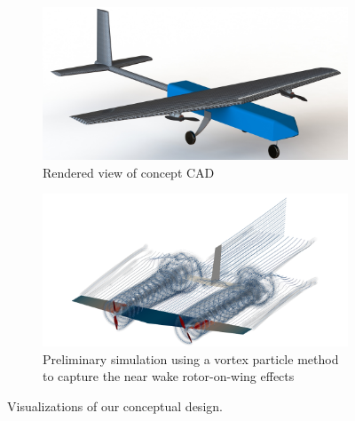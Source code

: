 \begin{figure}[h!]
	\centering
	\begin{subfigure}[t]{0.475\textwidth}
		\includegraphics[width=\textwidth]{figures/render.JPG}
		\caption{Rendered view of concept CAD}
		\label{fig:render}
	\end{subfigure}
	\begin{subfigure}[t]{0.475\textwidth}
		\includegraphics[width=\textwidth]{figures/vpmprelimsmall.png}
		\caption{Preliminary simulation using a vortex particle method to capture the near wake rotor-on-wing effects}
		\label{fig:vpm}
	\end{subfigure}
	\caption{Visualizations of our conceptual design.}
	\label{fig:conceptimages}
\end{figure}
